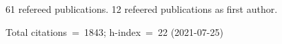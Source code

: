 61 refereed publications. 12 refeered publications as first author.

Total citations~=~1843; h-index~=~22 (2021-07-25)